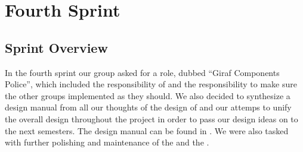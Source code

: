 \part{Fourth Sprint}
\label{par:fourth_sprint}

\chapter{Sprint Overview}
In the fourth sprint our group asked for a role, dubbed ``Giraf Components Police'', which included the responsibility of \gc and the responsibility to make sure the other groups implemented \gc as they should. We also decided to synthesize a design manual from all our thoughts of the design of \giraf and our attemps to unify the overall design throughout the project in order to pass our design ideas on to the next semesters. The design manual can be found in . We were also tasked with further polishing and maintenance of the \ct and the \launcher. 







